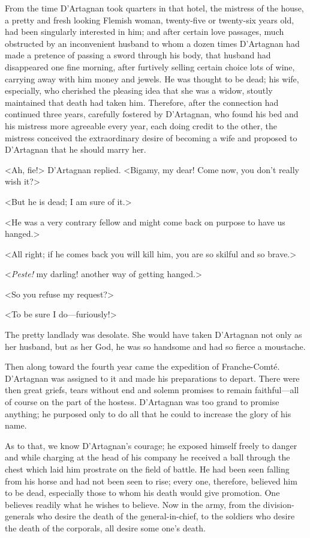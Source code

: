 From the time D'Artagnan took quarters in that hotel, the mistress of the house, a pretty and fresh looking Flemish woman, twenty-five or twenty-six years old, had been singularly interested in him; and after certain love passages, much obstructed by an inconvenient husband to whom a dozen times D'Artagnan had made a pretence of passing a sword through his body, that husband had disappeared one fine morning, after furtively selling certain choice lots of wine, carrying away with him money and jewels. He was thought to be dead; his wife, especially, who cherished the pleasing idea that she was a widow, stoutly maintained that death had taken him. Therefore, after the connection had continued three years, carefully fostered by D'Artagnan, who found his bed and his mistress more agreeable every year, each doing credit to the other, the mistress conceived the extraordinary desire of becoming a wife and proposed to D'Artagnan that he should marry her.

<Ah, fie!> D'Artagnan replied. <Bigamy, my dear! Come now, you don't really wish it?>

<But he is dead; I am sure of it.>

<He was a very contrary fellow and might come back on purpose to have us hanged.>

<All right; if he comes back you will kill him, you are so skilful and so brave.>

<\textit{Peste!} my darling! another way of getting hanged.>

<So you refuse my request?>

<To be sure I do—furiously!>

The pretty landlady was desolate. She would have taken D'Artagnan not only as her husband, but as her God, he was so handsome and had so fierce a moustache.

Then along toward the fourth year came the expedition of Franche-Comté. D'Artagnan was assigned to it and made his preparations to depart. There were then great griefs, tears without end and solemn promises to remain faithful—all of course on the part of the hostess. D'Artagnan was too grand to promise anything; he purposed only to do all that he could to increase the glory of his name.

As to that, we know D'Artagnan's courage; he exposed himself freely to danger and while charging at the head of his company he received a ball through the chest which laid him prostrate on the field of battle. He had been seen falling from his horse and had not been seen to rise; every one, therefore, believed him to be dead, especially those to whom his death would give promotion. One believes readily what he wishes to believe. Now in the army, from the division-generals who desire the death of the general-in-chief, to the soldiers who desire the death of the corporals, all desire some one's death.

